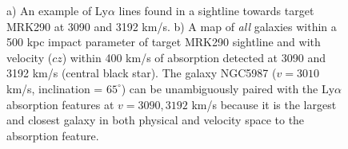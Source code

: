 \documentclass[iop]{emulateapj-rtx4}
\begin{document}
\begin{figure}[ht!]
  \caption{\small{a) An example of Ly$\alpha$ lines found in a sightline towards target MRK290 at 3090 and 3192 km/s. b) A map of \textit{all} galaxies within a 500 kpc impact parameter of target MRK290 sightline and with velocity ($cz$) within 400 km/s of absorption detected at 3090 and 3192 km/s (central black star). The galaxy NGC5987 ($v=3010$ km/s, inclination = $65^{\circ}$) can be unambiguously paired with the Ly$\alpha$ absorption features at $v=3090, 3192$ km/s because it is the largest and closest galaxy in both physical and velocity space to the absorption feature.}}
\vspace{5pt}
\end{figure}

\end{document}

